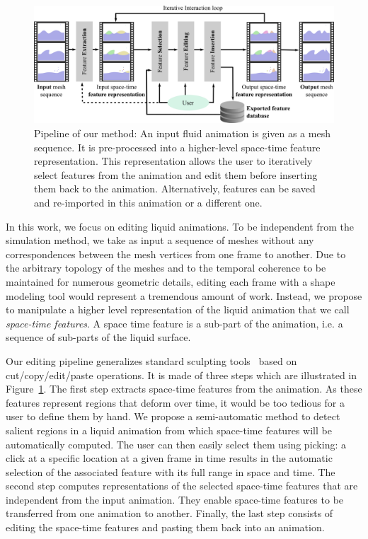 \begin{figure}[htp!]
\centering
\includegraphics[width=\linewidth]{images/fluidsculpting-mig2016/overview_2.png}
\caption[Fluid sculpting: Overview]{
Pipeline of our method: 
An input fluid animation is given as a mesh sequence. 
It is pre-processed into a higher-level space-time feature representation. 
This representation allows the user to iteratively select features from the animation and edit them before inserting them back to the animation. 
Alternatively, features can be saved and re-imported in this animation or a different one. }
\label{fig:overview}
\end{figure}

In this work, we focus on editing liquid animations.
To be independent from the simulation method, we take as input a sequence of meshes without any correspondences between the mesh vertices from one frame to another. 
Due to the arbitrary topology of the meshes and to the temporal coherence to be maintained for numerous geometric details, editing each frame with a shape modeling tool would represent a tremendous amount of work.
Instead, we propose to manipulate a higher level representation of the liquid animation that we call \emph{space-time features}. A space time feature is a sub-part of the animation, i.e. a sequence of sub-parts of the liquid surface. 

Our editing pipeline generalizes standard sculpting tools~\cite{Ferley2000} based on cut/copy/edit/paste operations.
It is made of three steps which are illustrated in Figure~\ref{fig:overview}. 
The first step extracts space-time features from the animation. As these features represent regions that deform over time, it would be too tedious for a user to define them by hand. We propose a semi-automatic method to detect salient regions in a liquid animation from which space-time features will be automatically computed. 
The user can then easily select them using picking: a click at a specific location at a given frame in time results in the automatic selection of the associated feature with its full range in space and time.
The second step computes representations of the selected space-time features that are independent from the input animation.
They enable space-time features to be transferred from one animation to another. 
Finally, the last step consists of editing the space-time features and pasting them back into an animation.



